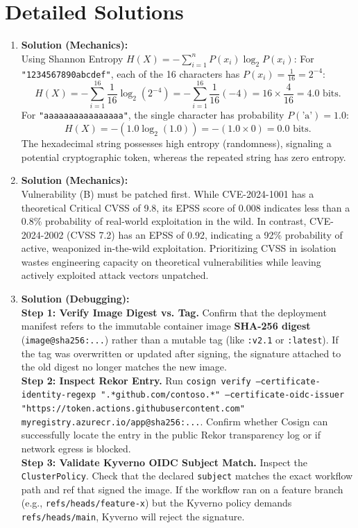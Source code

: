 \section{Detailed Solutions}
\begin{enumerate}[leftmargin=18pt]
  \item \textbf{Solution (Mechanics):}\\
  Using Shannon Entropy $H(X) = -\sum_{i=1}^{n} P(x_i) \log_2 P(x_i)$:
  For \texttt{"1234567890abcdef"}, each of the 16 characters has $P(x_i) = \frac{1}{16} = 2^{-4}$:
  \begin{equation*}
  H(X) = -\sum_{i=1}^{16} \frac{1}{16} \log_2(2^{-4}) = -\sum_{i=1}^{16} \frac{1}{16} (-4) = 16 \times \frac{4}{16} = 4.0 \text{ bits}.
  \end{equation*}
  For \texttt{"aaaaaaaaaaaaaaaa"}, the single character has probability $P(\text{'a'}) = 1.0$:
  \begin{equation*}
  H(X) = - (1.0 \log_2(1.0)) = - (1.0 \times 0) = 0.0 \text{ bits}.
  \end{equation*}
  The hexadecimal string possesses high entropy (randomness), signaling a potential cryptographic token, whereas the repeated string has zero entropy.

  \item \textbf{Solution (Mechanics):}\\
  Vulnerability (B) must be patched first. While CVE-2024-1001 has a theoretical Critical CVSS of 9.8, its EPSS score of 0.008 indicates less than a 0.8\% probability of real-world exploitation in the wild. In contrast, CVE-2024-2002 (CVSS 7.2) has an EPSS of 0.92, indicating a 92\% probability of active, weaponized in-the-wild exploitation. Prioritizing CVSS in isolation wastes engineering capacity on theoretical vulnerabilities while leaving actively exploited attack vectors unpatched.

  \item \textbf{Solution (Debugging):}\\
  \textbf{Step 1: Verify Image Digest vs. Tag.} Confirm that the deployment manifest refers to the immutable container image \textbf{SHA-256 digest} (\texttt{image@sha256:...}) rather than a mutable tag (like \texttt{:v2.1} or \texttt{:latest}). If the tag was overwritten or updated after signing, the signature attached to the old digest no longer matches the new image.\\
  \textbf{Step 2: Inspect Rekor Entry.} Run \texttt{cosign verify --certificate-identity-regexp ".*github.com/contoso.*" --certificate-oidc-issuer "https://token.actions.githubusercontent.com" myregistry.azurecr.io/app@sha256:...}. Confirm whether Cosign can successfully locate the entry in the public Rekor transparency log or if network egress is blocked.\\
  \textbf{Step 3: Validate Kyverno OIDC Subject Match.} Inspect the \texttt{ClusterPolicy}. Check that the declared \texttt{subject} matches the exact workflow path and ref that signed the image. If the workflow ran on a feature branch (e.g., \texttt{refs/heads/feature-x}) but the Kyverno policy demands \texttt{refs/heads/main}, Kyverno will reject the signature.


\end{enumerate}
